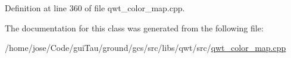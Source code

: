 Definition at line 360 of file qwt\-\_\-color\-\_\-map.\-cpp.



The documentation for this class was generated from the following file\-:\begin{DoxyCompactItemize}
\item 
/home/jose/\-Code/gui\-Tau/ground/gcs/src/libs/qwt/src/\hyperlink{qwt__color__map_8cpp}{qwt\-\_\-color\-\_\-map.\-cpp}\end{DoxyCompactItemize}

